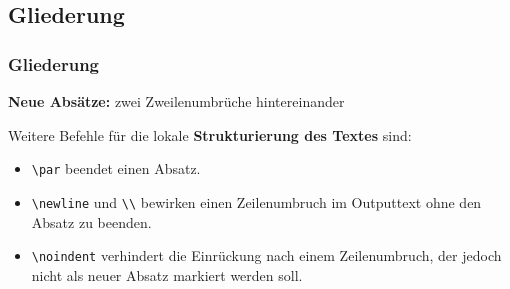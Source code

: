 \subsection{Gliederung}

\begin{frame}[fragile]
\frametitle{Gliederung}

\textbf{Neue Absätze:} zwei Zweilenumbrüche hintereinander

Weitere Befehle für die lokale \textbf{Strukturierung des Textes} sind:

\begin{itemize}
\item \lstinline|\par| beendet einen Absatz.
\item \lstinline|\newline| und \lstinline|\\| bewirken einen Zeilenumbruch im Outputtext ohne den Absatz zu beenden.
\item \lstinline|\noindent| verhindert die Einrückung nach einem Zeilenumbruch, der jedoch nicht als neuer Absatz markiert werden soll.
\end{itemize}

\end{frame}


